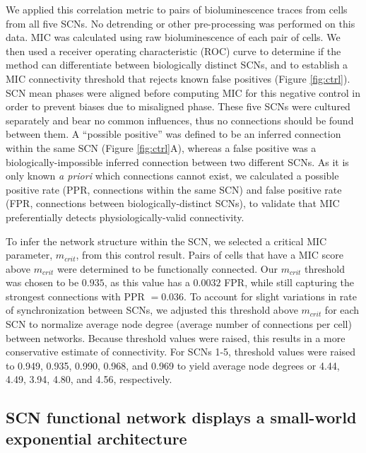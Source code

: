 We applied this correlation metric to pairs of bioluminescence traces from cells from all five SCNs. 
No detrending or other pre-processing was performed on this data.
MIC was calculated using raw bioluminescence of each pair of cells.
We then used a receiver operating characteristic (ROC) curve to determine if the method can differentiate between biologically distinct SCNs, and to establish a MIC connectivity threshold that rejects known false positives (Figure \ref{fig:ctrl}). 
SCN mean phases were aligned before computing MIC for this negative control in order to prevent biases due to misaligned phase.
These five SCNs were cultured separately and bear no common influences, thus no connections should be found between them. 
A ``possible positive'' was defined to be an inferred connection within the same SCN (Figure \ref{fig:ctrl}A), whereas a false positive was a
biologically-impossible inferred connection between two different SCNs. 
As it is only known \textit{a priori} which connections cannot exist, we calculated a possible positive rate (PPR, connections within the same SCN) and false positive rate (FPR, connections between biologically-distinct SCNs), to validate that MIC preferentially detects physiologically-valid connectivity.

To infer the network structure within the SCN, we selected a critical MIC  parameter, $m_{crit}$, from this control result.  
Pairs of cells that have a MIC score above $m_{crit}$ were determined to be functionally connected.
Our $m_{crit}$ threshold was chosen to be $0.935$, as 
this value has a $0.0032$ FPR, while still capturing the strongest connections with PPR $= 0.036$.
To account for slight variations in rate of synchronization between SCNs, we adjusted this threshold above $m_{crit}$ for each SCN to normalize average node degree (average number of connections per cell) between networks.
Because threshold values were raised, this results in a more conservative estimate of connectivity.
For SCNs 1-5, threshold values were raised to 0.949, 0.935, 0.990, 0.968, and 0.969 to yield average node degrees or 4.44, 4.49, 3.94, 4.80, and 4.56, respectively. 

\subsection*{SCN functional network displays a small-world exponential architecture}

